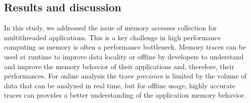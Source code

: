 


\subsection{Results and discussion}


In this study, we addressed the issue of memory accesses collection for
multithreaded applications. This is a key challenge in high performance
computing as memory is often a performance
bottleneck. Memory traces can be used at runtime to improve data locality or
offline by developers to understand and improve the memory
behavior of their applications and, therefore, their performances. For online analysis the trace \emph{precision}
is limited by the volume of data that can be analyzed in real time, but for
offline usage, highly accurate traces can provides a better understanding of
the application memory behavior.

